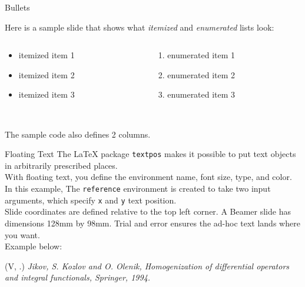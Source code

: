 \documentclass[12pt, xcolor=dvipsnames]{beamer}
\newenvironment{reference}[2]{                                    %
  \begin{textblock*}{\textwidth}(#1, #2)
      \tiny\it\bgroup\color{red!70!QPblue}}{\egroup\end{textblock*}}
\begin{document}

\begin{frame}{Bullets}

Here is a sample slide that shows what \emph{itemized} and \emph{enumerated} lists look:

\begin{columns}
  \begin{column}{0.45\textwidth}
  \begin{itemize}
    \item itemized item 1
    \item itemized item 2
    \item itemized item 3
  \end{itemize}
  \end{column}

  \begin{column}{0.45\textwidth}
  \begin{enumerate}
    \item enumerated item 1
    \item enumerated item 2
    \item enumerated item 3
  \end{enumerate}
  \end{column}
\end{columns}
~\\[2ex]

The sample code also defines 2 columns.

\end{frame}


\begin{frame}{Floating Text}
The \LaTeX{} package \texttt{textpos} makes it possible to put text objects in arbitrarily prescribed places.\\[2ex]

With floating text, you define the environment name, font size, type, and color.\\[2ex]

In this example, The \texttt{reference} environment is created to take two input arguments, which specify \texttt{x} and \texttt{y} text position.\\[2ex]

Slide coordinates are defined relative to the top left corner.  A Beamer slide has dimensions 128mm by 98mm.  Trial and error ensures the ad-hoc text lands where you want.\\[2ex]

Example below:

\begin{reference}{4mm}{75mm}
      V. Jikov, S. Kozlov and O. Olenik, Homogenization of differential operators and integral functionals, Springer, 1994.
\end{reference}
\end{frame}

\end{document}
